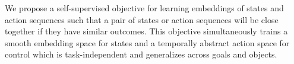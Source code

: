 %

We propose a self-supervised objective for learning embeddings of states and action sequences such that a pair of states or action sequences will be close together if they have similar outcomes.
This objective simultaneously trains a smooth embedding space for states and a temporally abstract action space for control which is task-independent and generalizes across goals and objects.


